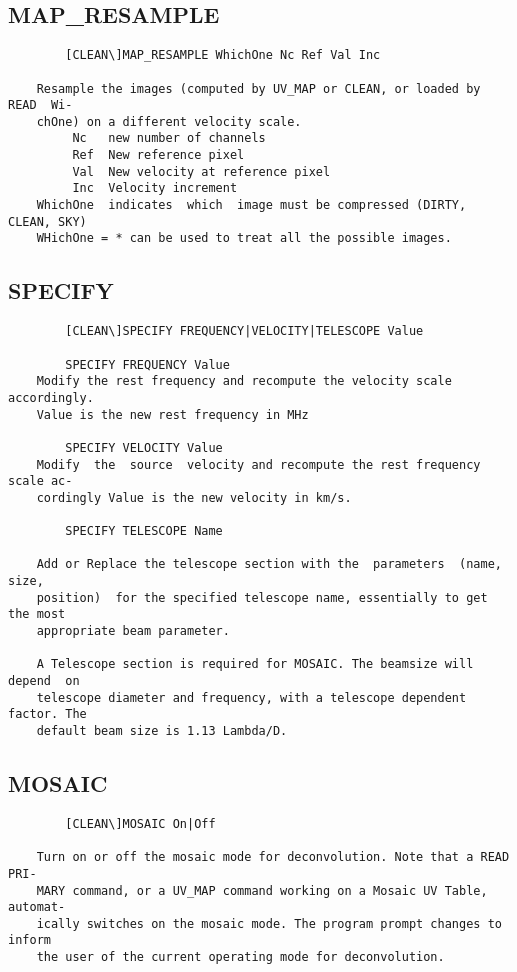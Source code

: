 \subsection{MAP\_RESAMPLE}
\begin{verbatim}
        [CLEAN\]MAP_RESAMPLE WhichOne Nc Ref Val Inc

    Resample the images (computed by UV_MAP or CLEAN, or loaded by READ  Wi-
    chOne) on a different velocity scale.
         Nc   new number of channels
         Ref  New reference pixel
         Val  New velocity at reference pixel
         Inc  Velocity increment
    WhichOne  indicates  which  image must be compressed (DIRTY, CLEAN, SKY)
    WHichOne = * can be used to treat all the possible images.

\end{verbatim}
\subsection{SPECIFY}
\begin{verbatim}
        [CLEAN\]SPECIFY FREQUENCY|VELOCITY|TELESCOPE Value

        SPECIFY FREQUENCY Value
    Modify the rest frequency and recompute the velocity scale  accordingly.
    Value is the new rest frequency in MHz

        SPECIFY VELOCITY Value
    Modify  the  source  velocity and recompute the rest frequency scale ac-
    cordingly Value is the new velocity in km/s.

        SPECIFY TELESCOPE Name

    Add or Replace the telescope section with the  parameters  (name,  size,
    position)  for the specified telescope name, essentially to get the most
    appropriate beam parameter.

    A Telescope section is required for MOSAIC. The beamsize will depend  on
    telescope diameter and frequency, with a telescope dependent factor. The
    default beam size is 1.13 Lambda/D.

\end{verbatim}
\subsection{MOSAIC}
\begin{verbatim}
        [CLEAN\]MOSAIC On|Off

    Turn on or off the mosaic mode for deconvolution. Note that a READ  PRI-
    MARY command, or a UV_MAP command working on a Mosaic UV Table, automat-
    ically switches on the mosaic mode. The program prompt changes to inform
    the user of the current operating mode for deconvolution.

\end{verbatim}

